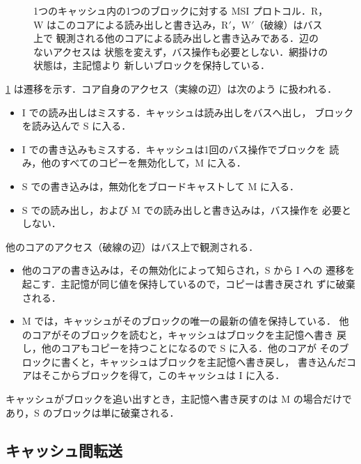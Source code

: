 \documentclass[../main.tex]{subfiles}
\begin{document}
\begin{figure}[htbp]
  \centering
  
  \caption{1つのキャッシュ内の1つのブロックに対する MSI プロトコル．R，W
    はこのコアによる読み出しと書き込み，R$'$，W$'$（破線）はバス上で
    観測される他のコアによる読み出しと書き込みである．辺のないアクセスは
    状態を変えず，バス操作も必要としない．網掛けの状態は，主記憶より
    新しいブロックを保持している．}
  \label{fig:l19-msi}
\end{figure}

\cref{fig:l19-msi} は遷移を示す．コア自身のアクセス（実線の辺）は次のよう
に扱われる．
\begin{itemize}
  \item I での読み出しはミスする．キャッシュは読み出しをバスへ出し，
    ブロックを読み込んで S に入る．
  \item I での書き込みもミスする．キャッシュは1回のバス操作でブロックを
    読み，他のすべてのコピーを無効化して，M に入る．
  \item S での書き込みは，無効化をブロードキャストして M に入る．
  \item S での読み出し，および M での読み出しと書き込みは，バス操作を
    必要としない．
\end{itemize}
他のコアのアクセス（破線の辺）はバス上で観測される．
\begin{itemize}
  \item 他のコアの書き込みは，その無効化によって知らされ，S から I への
    遷移を起こす．主記憶が同じ値を保持しているので，コピーは書き戻され
    ずに破棄される．
  \item M では，キャッシュがそのブロックの唯一の最新の値を保持している．
    他のコアがそのブロックを読むと，キャッシュはブロックを主記憶へ書き
    戻し，他のコアもコピーを持つことになるので S に入る．他のコアが
    そのブロックに書くと，キャッシュはブロックを主記憶へ書き戻し，
    書き込んだコアはそこからブロックを得て，このキャッシュは I に入る．
\end{itemize}
キャッシュがブロックを追い出すとき，主記憶へ書き戻すのは M の場合だけで
あり，S のブロックは単に破棄される．

\subsection{キャッシュ間転送}
\label{sec:l19-c2c}
\end{document}
